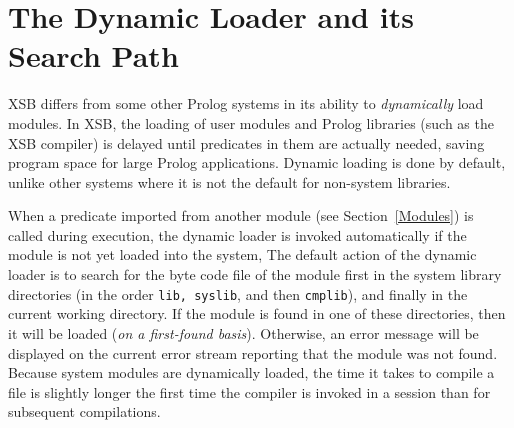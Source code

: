 \section{The Dynamic Loader and its Search Path} \label{LibPath}

XSB differs from some other Prolog systems in its ability to {\em
  dynamically} load modules.  In XSB, the loading of user modules and
Prolog libraries (such as the XSB compiler) is delayed until
predicates in them are actually needed, saving program space for large
Prolog applications.  Dynamic loading is done by default, unlike other
systems where it is not the default for non-system libraries.

When a predicate imported from another module (see
Section~\ref{Modules}) is called during execution, the dynamic loader
is invoked automatically if the module is not yet loaded into the
system, The default action of the dynamic loader is to search for the
byte code file of the module first in the system library directories
(in the order {\tt lib, syslib}, and then {\tt cmplib}), and finally
in the current working directory.  If the module is found in one of
these directories, then it will be loaded ({\em on a first-found
basis}). Otherwise, an error message will be displayed on the current
error stream reporting that the module was not found.  Because system
modules are dynamically loaded, the time it takes to compile a file is
slightly longer the first time the compiler is invoked in a session
than for subsequent compilations.


